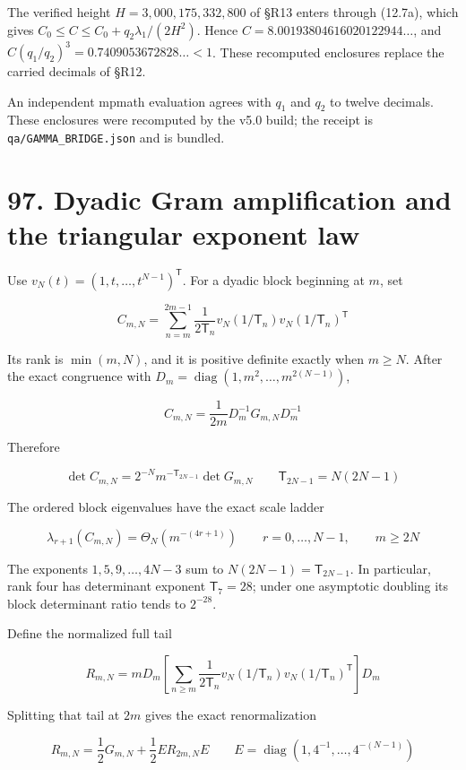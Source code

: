 \documentclass[
  11pt,
]{book}
\begin{document}
The verified height \(H=3{,}000{,}175{,}332{,}800\) of §R13 enters
through (12.7a), which gives \(C_0\le C\le C_0+q_2\lambda_1/(2H^2)\).
Hence \(C=8.00193804616020122944\ldots\), and
\(C(q_1/q_2)^3=0.7409053672828\ldots<1\). These recomputed enclosures
replace the carried decimals of §R12.

An independent mpmath evaluation agrees with \(q_1\) and \(q_2\) to
twelve decimals. These enclosures were recomputed by the v5.0 build; the
receipt is \texttt{qa/GAMMA\_BRIDGE.json} and is bundled.

\section{97. Dyadic Gram amplification and the triangular exponent
law}\label{dyadic-gram-amplification-and-the-triangular-exponent-law}

Use \(v_N(t)=(1,t,\ldots,t^{N-1})^{\mathsf T}\). For a dyadic block
beginning at \(m\), set

\[
C_{m,N}=\sum_{n=m}^{2m-1}\frac1{2\mathsf T_n}
v_N(1/\mathsf T_n)v_N(1/\mathsf T_n)^{\mathsf T}
\tag{97.1}
\]

Its rank is \(\min(m,N)\), and it is positive definite exactly when
\(m\ge N\). After the exact congruence with
\(D_m=\operatorname{diag}(1,m^2,\ldots,m^{2(N-1)})\),

\[
C_{m,N}=\frac1{2m}D_m^{-1}G_{m,N}D_m^{-1}
\tag{97.2}
\]

Therefore

\[
\boxed{
\det C_{m,N}=2^{-N}m^{-\mathsf T_{2N-1}}\det G_{m,N}
\qquad
\mathsf T_{2N-1}=N(2N-1)
}
\tag{97.3}
\]

The ordered block eigenvalues have the exact scale ladder

\[
\boxed{
\lambda_{r+1}(C_{m,N})=\Theta_N(m^{-(4r+1)})
\qquad r=0,\ldots,N-1,\qquad m\ge2N
}
\tag{97.4}
\]

The exponents \(1,5,9,\ldots,4N-3\) sum to \(N(2N-1)=\mathsf T_{2N-1}\).
In particular, rank four has determinant exponent \(\mathsf T_7=28\);
under one asymptotic doubling its block determinant ratio tends to
\(2^{-28}\).

Define the normalized full tail

\[
R_{m,N}=mD_m\left[\sum_{n\ge m}\frac{1}{2\mathsf T_n}
v_N(1/\mathsf T_n)v_N(1/\mathsf T_n)^{\mathsf T}\right]D_m
\]

Splitting that tail at \(2m\) gives the exact renormalization

\[
R_{m,N}=\frac12G_{m,N}+\frac12ER_{2m,N}E
\qquad
E=\operatorname{diag}(1,4^{-1},\ldots,4^{-(N-1)})
\tag{97.5}
\]
\end{document}
